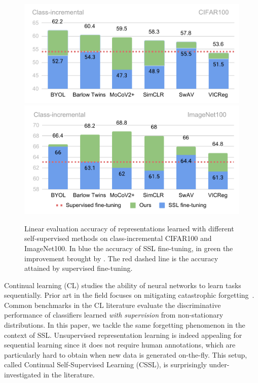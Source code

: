 \begin{figure}[t]
\centering
\vspace{-5pt}
\includegraphics[width=0.99\columnwidth]{figures/cifar100.pdf}
\vspace{-12pt}
\includegraphics[width=0.99\columnwidth]{figures/im100.pdf}
\caption{Linear evaluation accuracy of representations learned with different self-supervised methods on class-incremental CIFAR100 and ImageNet100. In blue the accuracy of SSL fine-tuning, in green the improvement brought by \name{}. The red  dashed line is the accuracy attained by supervised fine-tuning.}
\vspace{-15pt}
\label{fig:teaser}
\end{figure}


Continual learning (CL) studies the ability of neural networks to learn tasks sequentially. Prior art in the field focuses on mitigating {catastrophic forgetting}~\cite{Mccloskey89,French99, Goodfellow13,de2019continual}. Common benchmarks in the CL literature evaluate the discriminative performance of classifiers learned \emph{with supervision} from non-stationary distributions. 
In this paper, we tackle the same forgetting phenomenon in the context of SSL. 
Unsupervised representation learning is indeed appealing for sequential learning since it does not require human annotations, which are particularly hard to obtain when new data is generated on-the-fly. This setup, called Continual Self-Supervised Learning (CSSL), is surprisingly under-investigated in the literature.

